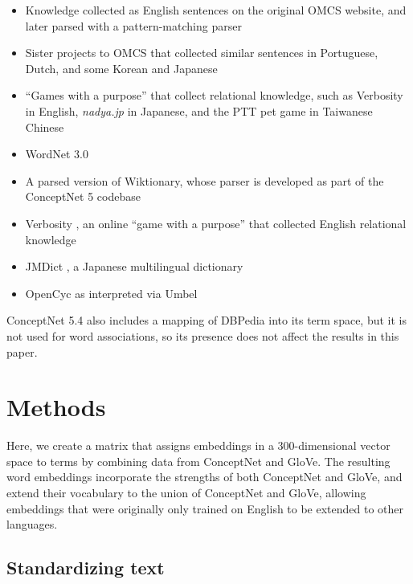 \documentclass[letterpaper]{article}
\begin{document}
\begin{itemize}
\item Knowledge collected as English sentences on the original OMCS website,
    and later parsed with a pattern-matching parser
\item Sister projects to OMCS that collected similar sentences in Portuguese,
    Dutch, and some Korean and Japanese \cite{anacleto2006portuguese}
    \cite{eckhardt2008dutch} \cite{TODO-globalmind}
\item ``Games with a purpose'' that collect relational knowledge, such as
    Verbosity \cite{vonahn2006verbosity} in English, {\em nadya.jp}
    \cite{TODOnadya} in Japanese, and the PTT pet game \cite{kuo2009petgame}
    in Taiwanese Chinese
\item WordNet 3.0 \cite{fellbaum1998wordnet}
\item A parsed version of Wiktionary, whose parser is developed as part of the
    ConceptNet 5 codebase
\item Verbosity \cite{suranaTODOverbosity}, an online ``game with a purpose''
    that collected English relational knowledge
\item JMDict \cite{TODOjmdict}, a Japanese multilingual dictionary
\item OpenCyc \cite{TODOcyc} as interpreted via Umbel \cite{TODOumbel}
\end{itemize}

ConceptNet 5.4 also includes a mapping of DBPedia \cite{auer2007dbpedia} into
its term space, but it is not used for word associations, so its presence does
not affect the results in this paper.



\section{Methods}

Here, we create a matrix that assigns embeddings in a 300-dimensional vector
space to terms by combining data from ConceptNet and GloVe. The resulting word
embeddings incorporate the strengths of both ConceptNet and GloVe, and extend
their vocabulary to the union of ConceptNet and GloVe, allowing embeddings that
were originally only trained on English to be extended to other languages.

\subsection{Standardizing text}
\end{document}
